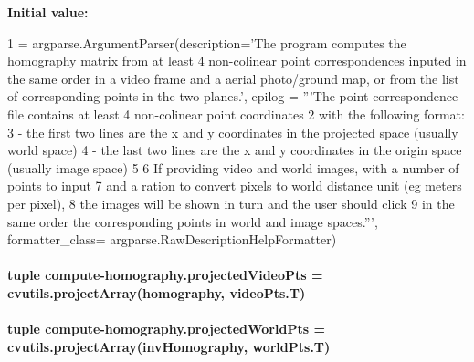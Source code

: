 {\bfseries Initial value\-:}
\begin{DoxyCode}
1 = argparse.ArgumentParser(description=\textcolor{stringliteral}{'The program computes the homography matrix from at least 4
       non-colinear point correspondences inputed in the same order in a video frame and a aerial photo/ground map, or from
       the list of corresponding points in the two planes.'}, epilog = \textcolor{stringliteral}{'''The point correspondence file contains at
       least 4 non-colinear point coordinates }
2 \textcolor{stringliteral}{with the following format:}
3 \textcolor{stringliteral}{ - the first two lines are the x and y coordinates in the projected space (usually world space)}
4 \textcolor{stringliteral}{ - the last two lines are the x and y coordinates in the origin space (usually image space)}
5 \textcolor{stringliteral}{}
6 \textcolor{stringliteral}{If providing video and world images, with a number of points to input}
7 \textcolor{stringliteral}{and a ration to convert pixels to world distance unit (eg meters per pixel), }
8 \textcolor{stringliteral}{the images will be shown in turn and the user should click }
9 \textcolor{stringliteral}{in the same order the corresponding points in world and image spaces.'''}, formatter\_class=
      argparse.RawDescriptionHelpFormatter)
\end{DoxyCode}
\hypertarget{namespacecompute-homography_a39f7af0562dd06b5fc283541e160732b}{
\paragraph[{projected\-Video\-Pts}]{\setlength{\rightskip}{0pt plus 5cm}tuple compute-\/homography.\-projected\-Video\-Pts = {\bf cvutils.\-project\-Array}({\bf homography}, video\-Pts.\-T)}}\label{namespacecompute-homography_a39f7af0562dd06b5fc283541e160732b}
\hypertarget{namespacecompute-homography_a2bef6977b46ae10e4de60341d387d4c2}{
\paragraph[{projected\-World\-Pts}]{\setlength{\rightskip}{0pt plus 5cm}tuple compute-\/homography.\-projected\-World\-Pts = {\bf cvutils.\-project\-Array}({\bf inv\-Homography}, world\-Pts.\-T)}}\label{namespacecompute-homography_a2bef6977b46ae10e4de60341d387d4c2}
